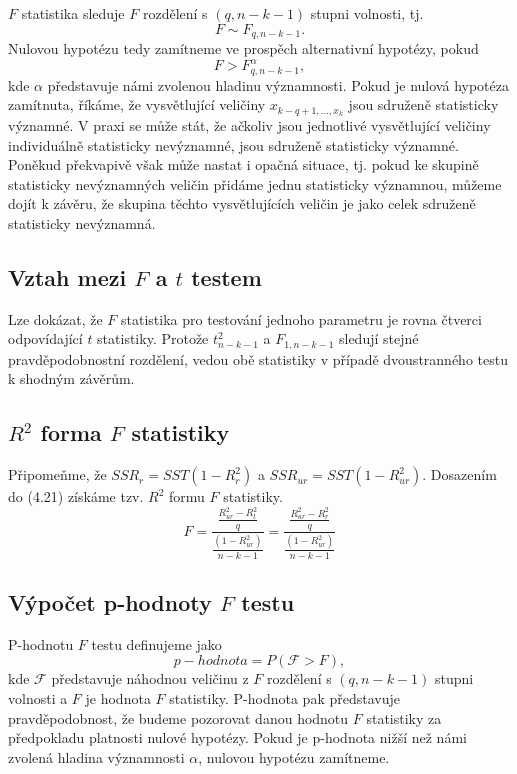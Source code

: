 $F$ statistika sleduje $F$ rozdělení s $(q, n - k - 1)$ stupni volnosti, tj.
\begin{equation}
F \sim F_{q, n - k - 1}.
\end{equation}
Nulovou hypotézu tedy zamítneme ve prospěch alternativní hypotézy, pokud
\begin{equation}
F > F_{q, n - k - 1}^{\alpha},
\end{equation}
kde $\alpha$ představuje námi zvolenou hladinu významnosti. Pokud je nulová hypotéza zamítnuta, říkáme, že vysvětlující veličiny $x_{k 
- q + 1, ..., x_k}$ jsou sdruženě statisticky významné. V praxi se může stát, že ačkoliv jsou jednotlivé vysvětlující veličiny 
individuálně statisticky nevýznamné, jsou sdruženě statisticky významné. Poněkud překvapivě však může nastat i opačná situace, tj. 
pokud ke skupině statisticky nevýznamných veličin přidáme jednu statisticky významnou, můžeme dojít k závěru, že skupina těchto 
vysvětlujících veličin je jako celek sdruženě statisticky nevýznamná.

\subsection{Vztah mezi $F$ a $t$ testem}

Lze dokázat, že $F$ statistika pro testování jednoho parametru je rovna čtverci odpovídající $t$ statistiky. Protože $t_{n - k - 1}^2$ a 
$F_{1, n - k - 1}$ sledují stejné pravděpodobnostní rozdělení, vedou obě statistiky v případě dvoustranného testu k shodným závěrům.

\subsection{$R^2$ forma $F$ statistiky}

Připomeňme, že $SSR_r = SST(1 - R_r^2)$ a $SSR_{ur} = SST(1 - R_{ur}^2)$. Dosazením do (4.21) získáme tzv. $R^2$ formu $F$ statistiky.
\begin{equation}
F = \frac{\frac{R_{ur}^2 - R_t^2}{q}}{\frac{(1 - R_{ur}^2)}{n - k -1}} = \frac{\frac{R_{ur}^2 - R_r^2}{q}}{\frac{(1 - R_{ur}^2)}{n - k - 1}}
\end{equation}

\subsection{Výpočet p-hodnoty $F$ testu}

P-hodnotu $F$ testu definujeme jako
\begin{equation}
p-hodnota = P(\mathcal{F} > F),
\end{equation}
kde $\mathcal{F}$ představuje náhodnou veličinu z $F$ rozdělení s $(q, n - k - 1)$ stupni volnosti a $F$ je hodnota $F$ statistiky. P-hodnota pak 
představuje pravděpodobnost, že budeme pozorovat danou hodnotu $F$ statistiky za předpokladu platnosti nulové hypotézy. Pokud je p-hodnota 
nižší než námi zvolená hladina významnosti $\alpha$, nulovou hypotézu zamítneme.

